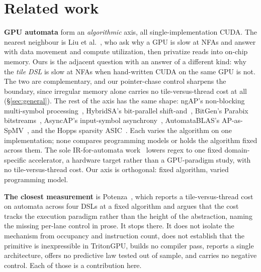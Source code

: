 \documentclass[sigplan,screen,review]{acmart}
\begin{document}
\section{Related work}\label{sec:related}
\textbf{GPU automata} form an \emph{algorithmic} axis, all single-implementation CUDA. The
nearest neighbour is Liu et al.~\cite{whyslownfa2020}, who ask why a GPU is slow at NFAs and
answer with data movement and compute utilization, then privatize reads into on-chip memory.
Ours is the adjacent question with an answer of a different kind: why the \emph{tile DSL} is
slow at NFAs when hand-written CUDA on the same GPU is not. The two are complementary, and
our pointer-chase control sharpens the boundary, since irregular memory alone carries no
tile-versus-thread cost at all (\S\ref{sec:general}). The rest of the axis has the same
shape: ngAP's non-blocking multi-symbol processing~\cite{ngap2024}, HybridSA's bit-parallel
shift-and~\cite{hybridsa2024}, BitGen's Parabix bitstreams~\cite{bitgen2025}, AsyncAP's
input-symbol asynchrony~\cite{asyncap2023}, AutomataBLAS's AP-as-SpMV~\cite{automatablas2025},
and the Hopps sparsity ASIC~\cite{hopps2025}. Each varies the algorithm on one
implementation; none compares programming models or holds the algorithm fixed across them.
The sole IR-for-automata work~\cite{mlirregex2025} lowers regex to one fixed
domain-specific accelerator, a hardware target rather than a GPU-paradigm study, with no
tile-versus-thread cost. Our axis is orthogonal: fixed algorithm, varied programming model.

\textbf{The closest measurement} is Potenza~\cite{twofaces2026}, which reports a
tile-versus-thread cost on automata across four DSLs at a fixed algorithm and argues that
the cost tracks the execution paradigm rather than the height of the abstraction, naming
the missing per-lane control in prose. It stops there. It does not isolate the mechanism
from occupancy and instruction count, does not establish that the primitive is
inexpressible in TritonGPU, builds no compiler pass, reports a single architecture, offers
no predictive law tested out of sample, and carries no negative control. Each of those is a
contribution here.
\end{document}
